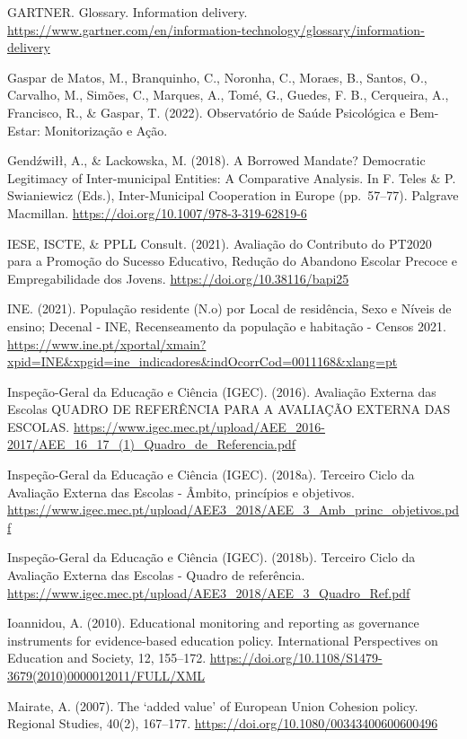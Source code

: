\documentclass[
]{book}
\begin{document}
GARTNER. Glossary. Information delivery. \url{https://www.gartner.com/en/information-technology/glossary/information-delivery}

Gaspar de Matos, M., Branquinho, C., Noronha, C., Moraes, B., Santos, O., Carvalho, M., Simões, C., Marques, A., Tomé, G., Guedes, F. B., Cerqueira, A., Francisco, R., \& Gaspar, T. (2022). Observatório de Saúde Psicológica e Bem-Estar: Monitorização e Ação.

Gendźwiłł, A., \& Lackowska, M. (2018). A Borrowed Mandate? Democratic Legitimacy of Inter-municipal Entities: A Comparative Analysis. In F. Teles \& P. Swianiewicz (Eds.), Inter-Municipal Cooperation in Europe (pp.~57--77). Palgrave Macmillan. \url{https://doi.org/10.1007/978-3-319-62819-6}

IESE, ISCTE, \& PPLL Consult. (2021). Avaliação do Contributo do PT2020 para a Promoção do Sucesso Educativo, Redução do Abandono Escolar Precoce e Empregabilidade dos Jovens. \url{https://doi.org/10.38116/bapi25}

INE. (2021). População residente (N.o) por Local de residência, Sexo e Níveis de ensino; Decenal - INE, Recenseamento da população e habitação - Censos 2021. \url{https://www.ine.pt/xportal/xmain?xpid=INE\&xpgid=ine_indicadores\&indOcorrCod=0011168\&xlang=pt}

Inspeção-Geral da Educação e Ciência (IGEC). (2016). Avaliação Externa das Escolas QUADRO DE REFERÊNCIA PARA A AVALIAÇÃO EXTERNA DAS ESCOLAS. \url{https://www.igec.mec.pt/upload/AEE_2016-2017/AEE_16_17_(1)_Quadro_de_Referencia.pdf}

Inspeção-Geral da Educação e Ciência (IGEC). (2018a). Terceiro Ciclo da Avaliação Externa das Escolas - Âmbito, princípios e objetivos. \url{https://www.igec.mec.pt/upload/AEE3_2018/AEE_3_Amb_princ_objetivos.pdf}

Inspeção-Geral da Educação e Ciência (IGEC). (2018b). Terceiro Ciclo da Avaliação Externa das Escolas - Quadro de referência. \url{https://www.igec.mec.pt/upload/AEE3_2018/AEE_3_Quadro_Ref.pdf}

Ioannidou, A. (2010). Educational monitoring and reporting as governance instruments for evidence-based education policy. International Perspectives on Education and Society, 12, 155--172. \url{https://doi.org/10.1108/S1479-3679(2010)0000012011/FULL/XML}

Mairate, A. (2007). The `added value' of European Union Cohesion policy. Regional Studies, 40(2), 167--177. \url{https://doi.org/10.1080/00343400600600496}
\end{document}
